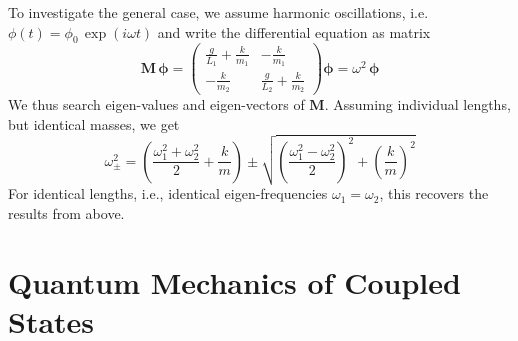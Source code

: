 To investigate the general case, we assume harmonic oscillations, i.e. $\phi(t) = \phi_0 \, \exp (i \omega t)$ and write the differential equation as matrix
\begin{equation} \boldsymbol{M \, \phi}	 = 
\begin{pmatrix}
  \frac{g}{L_1} +  \frac{k}{m_1}&  - \frac{k}{m_1}\\
 - \frac{k}{m_2} &  \frac{g}{L_2} +  \frac{k}{m_2}
\end{pmatrix}  \boldsymbol{\phi}	= \omega^2   \, \boldsymbol{\phi}
\end{equation}
We thus search eigen-values and eigen-vectors of  $\boldsymbol{M}$. Assuming individual lengths, but identical masses, we get
\begin{equation}
 \omega_{\pm}^2 = \left( \frac{\omega_1^2 + \omega_2^2}{2}  + \frac{k}{m} \right)
  \pm \sqrt{  \left( \frac{\omega_1^2 - \omega_2^2}{2}   \right)^2 + \left(  \frac{k}{m} \right)^2 }
\end{equation}
For identical lengths, i.e., identical eigen-frequencies $\omega_1 = \omega_2$, this recovers the results from above.


\section{Quantum Mechanics of Coupled States}

